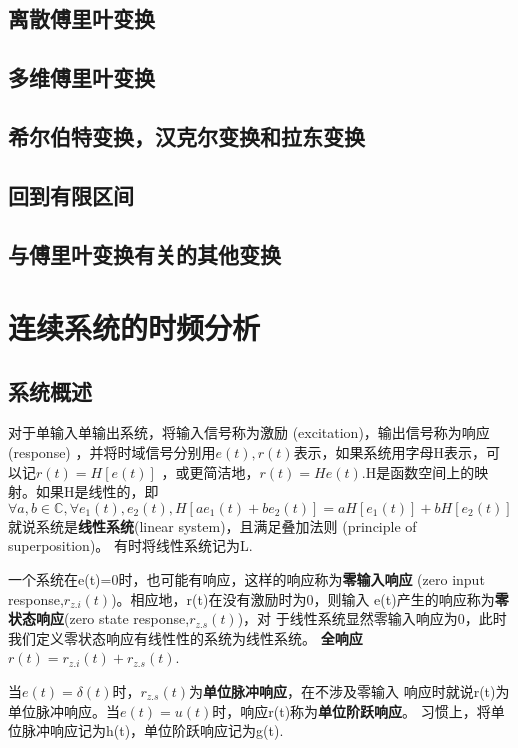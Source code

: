 \documentclass{ctexbook}
\begin{document}
\section{离散傅里叶变换}\label{sec:DFT}

\section{多维傅里叶变换}\label{sec:Multi_Fourier}

\section{希尔伯特变换，汉克尔变换和拉东变换}\label{sec:Hilbert_Hankel_Radon}

\section{回到有限区间}\label{sec:Finite_Interval}

\section{与傅里叶变换有关的其他变换}\label{sec:Other_Transforms}

\chapter{连续系统的时频分析}%

\section{系统概述}
对于单输入单输出系统，将输入信号称为激励 (excitation)，输出信号称为响应 (response)
，并将时域信号分别用$e(t),r(t)$表示，如果系统用字母H表示，可以记$r(t)=H[e(t)]$
，或更简洁地，$r(t)=He(t)$.H是函数空间上的映射。如果H是线性的，即
\[\forall a,b\in\mathbb{C},\forall e_1(t),e_2(t),H[ae_1(t)+be_2(t)]=aH[e_1(t)]+bH[e_2(t)]\]
就说系统是\textbf{线性系统}(linear system)，且满足叠加法则 (principle of superposition)。
有时将线性系统记为L.

一个系统在e(t)=0时，也可能有响应，这样的响应称为\textbf{零输入响应}
(zero input response,$r_{z.i}(t)$)。相应地，r(t)在没有激励时为0，则输入
e(t)产生的响应称为\textbf{零状态响应}(zero state response,$r_{z.s}(t)$)，对
于线性系统显然零输入响应为0，此时我们定义零状态响应有线性性的系统为线性系统。
\textbf{全响应}$r(t)=r_{z.i}(t)+r_{z.s}(t)$.

当$e(t)=\delta(t)$时，$r_{z.s}(t)$为\textbf{单位脉冲响应}，在不涉及零输入
响应时就说r(t)为单位脉冲响应。当$e(t)=u(t)$时，响应r(t)称为\textbf{单位阶跃响应}。
习惯上，将单位脉冲响应记为h(t)，单位阶跃响应记为g(t).
\end{document}
